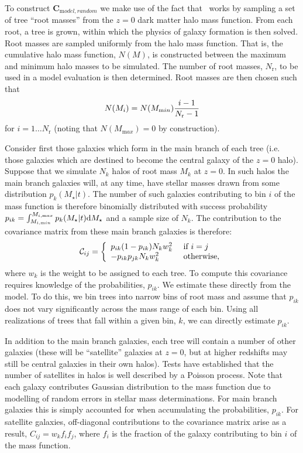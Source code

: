 To construct ${\mathbf C}_{\mathrm model,random}$ we make use of the fact that \glc\ works by sampling a set of tree ``root masses'' from the $z=0$ dark matter halo mass function. From each root, a tree is grown, within which the physics of galaxy formation is then solved. Root masses are sampled uniformly from the halo mass function. That is, the cumulative halo mass function, $N(M)$, is constructed between the maximum and minimum halo masses to be simulated. The number of root masses, $N_{\mathrm r}$, to be used in a model evaluation is then determined. Root masses are then chosen such that
\begin{equation}
 N(M_i) = N(M_{\mathrm min}) {i-1 \over N_{\mathrm r}-1}
\end{equation}
for $i=1\ldots N_{\mathrm r}$ (noting that $N(M_{\mathrm max})=0$ by construction). 

Consider first those galaxies which form in the main branch of each tree (i.e. those galaxies which are destined to become the central galaxy of the $z=0$ halo). Suppose that we simulate $N_k$ halos of root mass $M_k$ at $z=0$. In such halos the main branch galaxies will, at any time, have stellar masses drawn from some distribution $p_k(M_\star|t)$. The number of such galaxies contributing to bin $i$ of the mass function is therefore binomially distributed with success probability $p_{ik} = \int_{M_{i,\mathrm min}}^{M_{i,\mathrm max}} p_k(M_\star|t) \d M_\star$ and a sample size of $N_k$. The contribution to the covariance matrix from these main branch galaxies is therefore:
\begin{equation}
 \mathcal{C}_{ij} = \left\{ \begin{array}{ll} p_{ik}(1-p_{ik}) N_k w_k^2 & \hbox{ if } i = j \\ -p_{ik} p_{jk} N_k w_k^2 & \hbox{ otherwise,} \end{array} \right.
\end{equation}
where $w_k$ is the weight to be assigned to each tree. To compute this covariance requires knowledge of the probabilities, $p_{ik}$. We estimate these directly from the model. To do this, we bin trees into narrow bins of root mass and assume that $p_{ik}$ does not vary significantly across the mass range of each bin. Using all realizations of trees that fall within a given bin, $k$, we can directly estimate $p_{ik}$.

In addition to the main branch galaxies, each tree will contain a number of other galaxies (these will be ``satellite'' galaxies at $z=0$, but at higher redshifts may still be central galaxies in their own halos). Tests have established that the number of satellites in halos is well described by a Poisson process. Note that each galaxy contributes Gaussian distribution to the mass function due to modelling of random errors in stellar mass determinations. For main branch galaxies this is simply accounted for when accumulating the probabilities, $p_{ik}$. For satellite galaxies, off-diagonal contributions to the covariance matrix arise as a result, $C_{ij} = w_k f_i f_j$, where $f_i$ is the fraction of the galaxy contributing to bin $i$ of the mass function.

